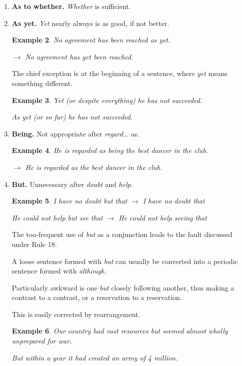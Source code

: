 \documentclass{book}
\numberwithin{equation}{section}
\newtheorem{example}{Example}[chapter]
\begin{document}
\begin{enumerate}
\begin{example}
        $\to$ My opinion is as good as his, or better (if not better).
    \end{example}
    \item \textbf{As to whether.} \textit{Whether} is sufficient.
    \item \textbf{As yet.} \textit{Yet} nearly always is as good, if not better.
    \begin{example}
        No agreement has been reached as yet.
        
        $\to$ No agreement has yet been reached.
    \end{example}
    The chief exception is at the beginning of a sentence, where \textit{yet} means something different.
    \begin{example}
        Yet (\emph{or} despite everything) he has not succeeded.
        
        As yet (\emph{or} so far) he has not succeeded.
    \end{example}
    \item \textbf{Being.} Not appropriate after \textit{regard$\ldots$} as.
    \begin{example}
        He is regarded as being the best dancer in the club.
        
        $\to$ He is regarded as the best dancer in the club.
    \end{example}
    \item \textbf{But.} Unnecessary after \textit{doubt} and \textit{help}.
    \begin{example}
        I have no doubt but that $\to$ I have no doubt that
        
        He could not help but see that $\to$ He could not help seeing that
    \end{example}
    The too-frequent use of \textit{but} as a conjunction leads to the fault discussed under Rule 18.
    
    A loose sentence formed with \textit{but} can usually be converted into a periodic sentence formed with \textit{although}.
    
    Particularly awkward is one \textit{but} closely following another, thus making a contrast to a contrast, or a reservation to a reservation.
    
    This is easily corrected by rearrangement.
    \begin{example}
        Our country had vast resources but seemed almost wholly unprepared for war.
        
        But within a year it had created an army of 4 million.
        

\end{example}
\end{enumerate}
\end{document}

